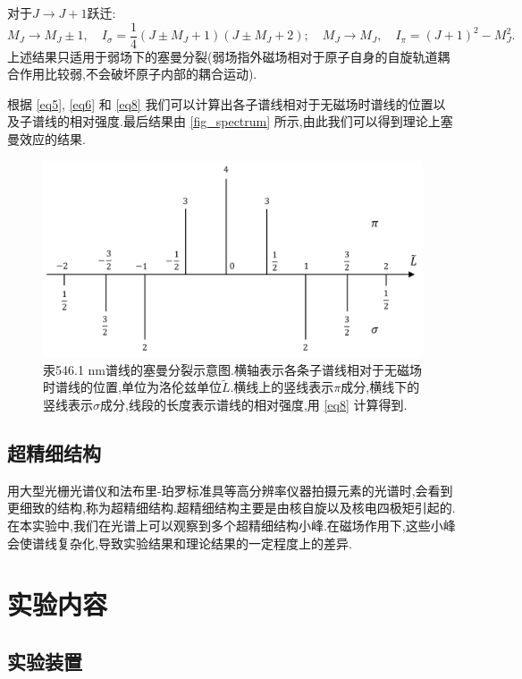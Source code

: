 \documentclass[font=default]{mpltx}
\begin{document}
对于$J\to J+1$跃迁:
\begin{equation}\label{eq8}
  M_J\to M_J\pm 1,\quad I_\sigma=\frac{1}{4}(J\pm M_J+1)(J\pm M_J+2);\quad M_J\to M_J,\quad I_\pi=(J+1)^2-M_J^2.
\end{equation}
上述结果只适用于弱场下的塞曼分裂(弱场指外磁场相对于原子自身的自旋轨道耦合作用比较弱,不会破坏原子内部的耦合运动).

根据 \autoref{eq5}, \autoref{eq6} 和 \autoref{eq8} 我们可以计算出各子谱线相对于无磁场时谱线的位置以及子谱线的相对强度.最后结果由 \autoref{fig_spectrum} 所示,由此我们可以得到理论上塞曼效应的结果.
\begin{figure}
  \centering
  \includegraphics[width=0.75\linewidth]{fig/spectrum.png}
  \caption{汞546.1 nm谱线的塞曼分裂示意图.横轴表示各条子谱线相对于无磁场时谱线的位置,单位为洛伦兹单位$\widetilde{L}$.横线上的竖线表示$\pi$成分,横线下的竖线表示$\sigma$成分,线段的长度表示谱线的相对强度,用 \autoref{eq8} 计算得到.}
  \label{fig_spectrum}
\end{figure}
\subsection{超精细结构}
用大型光栅光谱仪和法布里-珀罗标准具等高分辨率仪器拍摄元素的光谱时,会看到更细致的结构,称为超精细结构.超精细结构主要是由核自旋以及核电四极矩引起的.在本实验中,我们在光谱上可以观察到多个超精细结构小峰.在磁场作用下,这些小峰会使谱线复杂化,导致实验结果和理论结果的一定程度上的差异.

\section{实验内容}
\subsection{实验装置}
\end{document}
